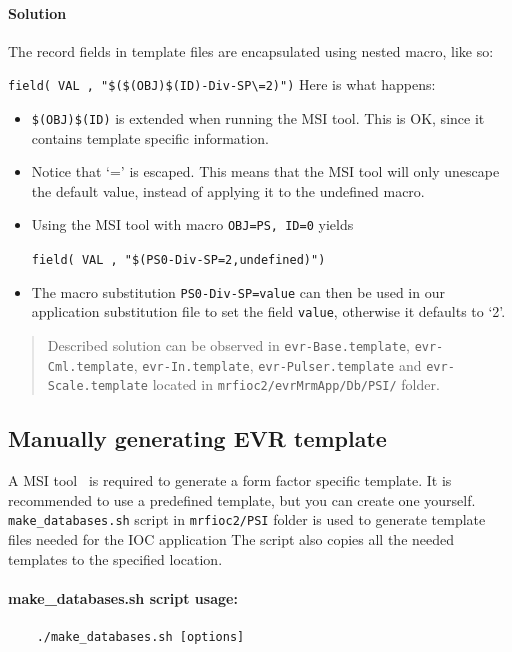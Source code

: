 \documentclass[12pt,a4paper]{article}
\begin{document}
\paragraph{Solution}\label{solution}
The record fields in template files are encapsulated using nested macro, like so:

\texttt{field( VAL , "\$(\$(OBJ)\$(ID)-Div-SP\textbackslash{}=2)")} 
Here is what happens: 
\begin{itemize}
\item 
	\texttt{\$(OBJ)\$(ID)} is extended when running the MSI tool.
This is OK, since it contains template specific information.
\item 
	Notice that `=' is escaped. This means that the MSI tool will only unescape the
default value, instead of applying it to the undefined macro. 
\item  
	Using the MSI tool with macro \texttt{OBJ=PS, ID=0} yields
	
\texttt{field( VAL , "\$(PS0-Div-SP=2,undefined)")} 
\item 
	The macro substitution \texttt{PS0-Div-SP=value} can then be used in our application substitution file to set the field \texttt{value}, otherwise it defaults to `2'.
\end{itemize}

\begin{quote}
Described solution can be observed in \texttt{evr-Base.template},
\texttt{evr-Cml.template}, \texttt{evr-In.template},
\texttt{evr-Pulser.template} and \texttt{evr-Scale.template} located in
\texttt{mrfioc2/evrMrmApp/Db/PSI/} folder.
\end{quote}

\subsection{Manually generating EVR template}\label{sec:manually-generating-evr-template}
A MSI tool~\cite{msi} is required to generate a form factor specific template. It
is recommended to use a predefined template, but you can create one yourself. 
\texttt{make\_databases.sh} script in \texttt{mrfioc2/PSI} folder is used to generate template files needed for the IOC application The script also copies all the needed templates to the specified location.

\paragraph{make\_databases.sh script usage:}
\begin{verbatim}
	./make_databases.sh [options]
\end{verbatim}
\end{document}
